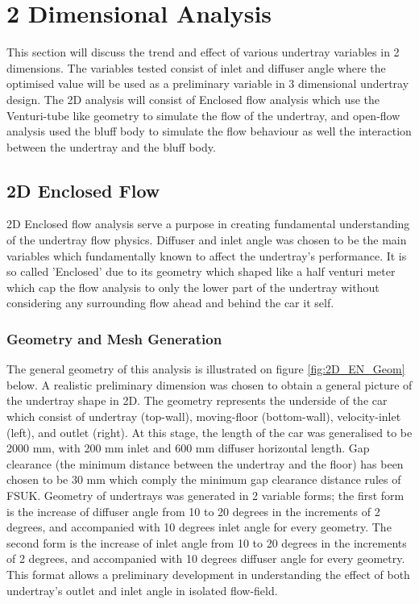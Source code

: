 
\section{2 Dimensional Analysis}
This section will discuss the trend and effect of various undertray variables in 2 dimensions. The variables tested consist of inlet and diffuser angle where the optimised value will be used as a preliminary variable in 3 dimensional undertray design. The 2D analysis will consist of Enclosed flow analysis which use the Venturi-tube like geometry to simulate the flow of the undertray, and open-flow analysis used the bluff body to simulate the flow behaviour as well the interaction between the undertray and the bluff body. 

\subsection{2D Enclosed Flow}
2D Enclosed flow analysis serve a purpose in creating fundamental understanding of the undertray flow physics. Diffuser and inlet angle was chosen to be the main variables which fundamentally known to affect the undertray's performance. It is so called 'Enclosed' due to its geometry which shaped like a half venturi meter which cap the flow analysis to only the lower part of the undertray without considering any surrounding flow ahead and behind the car it self.  %

\subsubsection{Geometry and Mesh Generation}
\noindent The general geometry of this analysis is illustrated on figure \ref{fig:2D_EN_Geom} below. A realistic preliminary dimension was chosen to obtain a general picture of the undertray shape in 2D. The geometry represents the underside of the car which consist of undertray (top-wall), moving-floor (bottom-wall), velocity-inlet (left), and outlet (right). At this stage, the length of the car was generalised to be 2000 mm, with 200 mm inlet and 600 mm diffuser horizontal length. Gap clearance (the minimum distance between the undertray and the floor) has been chosen to be 30 mm which comply the minimum gap clearance distance rules of FSUK. Geometry of undertrays was generated in 2 variable forms; the first form is the increase of diffuser angle from 10 to 20 degrees in the increments of 2 degrees, and accompanied with 10 degrees inlet angle for every geometry. The second form is the increase of inlet angle from 10 to 20 degrees in the increments of 2 degrees, and accompanied with 10 degrees diffuser angle for every geometry. This format allows a preliminary development in understanding the effect of both undertray's outlet and inlet angle in isolated flow-field. 


